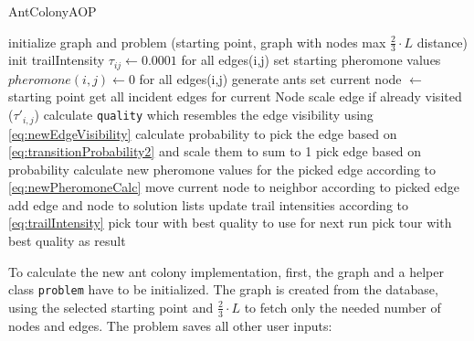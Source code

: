 \begin{breakablealgorithm}
	\caption{AntColonyAOP}
	\label{alg:AntColonyImplementation}
	\begin{algorithmic}[1]
		\STATE initialize graph and problem (starting point, graph with nodes max $\frac{2}{3} \cdot L$ distance)
		\STATE init trailIntensity $\tau_{ij} \gets 0.0001$ for all edges(i,j)
		\STATE set starting pheromone values $pheromone(i,j) \gets 0$ for all edges(i,j)
		\STATE generate ants
		\STATE set current node $\gets$ starting point
		\STATE get all incident edges for current Node
		\STATE scale edge if already visited ($\tau'_{i,j}$)
		\STATE calculate \texttt{quality} which resembles the edge visibility using \ref{eq:newEdgeVisibility}
		\ENDFOR
		\STATE calculate probability to pick the edge based on \ref{eq:transitionProbability2} and scale them to sum to 1
		\STATE pick edge based on probability
		\STATE calculate new pheromone values for the picked edge according to \ref{eq:newPheromoneCalc}
		\STATE move current node to neighbor according to picked edge 
		\STATE add edge and node to solution lists
		\ENDWHILE
		\ENDFOR
		\STATE update trail intensities according to \ref{eq:trailIntensity}
		\STATE pick tour with best quality to use for next run
		\ENDFOR
		\STATE pick tour with best quality as result
	\end{algorithmic}	
\end{breakablealgorithm}

To calculate the new ant colony implementation, first, the graph and a helper class \texttt{problem} have to be initialized. 
The graph is created from the database, using the selected starting point and $\frac{2}{3} \cdot L$ to fetch only the needed number of nodes and edges.
The problem saves all other user inputs:


